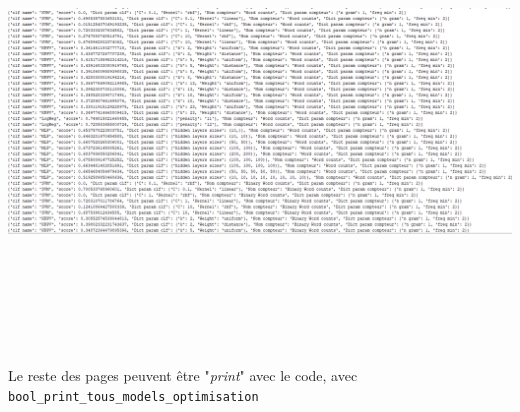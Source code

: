 \documentclass[12pt,french]{article}
\begin{document}
\includegraphics[width=\linewidth,height=12cm,keepaspectratio]{page_1}

Le reste des pages peuvent être "\emph{print}" avec le code, avec \verb|bool_print_tous_models_optimisation|
\end{document}
